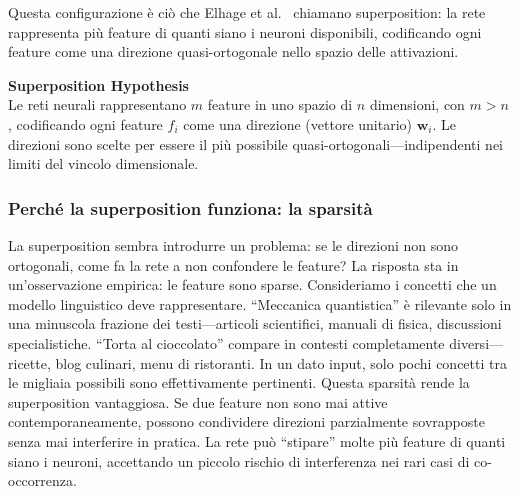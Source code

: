 Questa configurazione è ciò che Elhage et al.~\parencite{elhage2022superposition} chiamano superposition: la rete rappresenta più feature di quanti siano i neuroni disponibili, codificando ogni feature come una direzione quasi-ortogonale nello spazio delle attivazioni.
\begin{notebox}
\textbf{Superposition Hypothesis}\\
Le reti neurali rappresentano $m$ feature in uno spazio di $n$ dimensioni, con $m > n$, codificando ogni feature $f_i$ come una direzione (vettore unitario) $\mathbf{w}_i$. Le direzioni sono scelte per essere il più possibile quasi-ortogonali—indipendenti nei limiti del vincolo dimensionale.
\end{notebox}
\subsubsection{Perché la superposition funziona: la sparsità}
La superposition sembra introdurre un problema: se le direzioni non sono ortogonali, come fa la rete a non confondere le feature? La risposta sta in un'osservazione empirica: le feature sono sparse.
Consideriamo i concetti che un modello linguistico deve rappresentare. ``Meccanica quantistica'' è rilevante solo in una minuscola frazione dei testi—articoli scientifici, manuali di fisica, discussioni specialistiche. ``Torta al cioccolato'' compare in contesti completamente diversi—ricette, blog culinari, menu di ristoranti. In un dato input, solo pochi concetti tra le migliaia possibili sono effettivamente pertinenti.
Questa sparsità rende la superposition vantaggiosa. Se due feature non sono mai attive contemporaneamente, possono condividere direzioni parzialmente sovrapposte senza mai interferire in pratica. La rete può ``stipare'' molte più feature di quanti siano i neuroni, accettando un piccolo rischio di interferenza nei rari casi di co-occorrenza.
